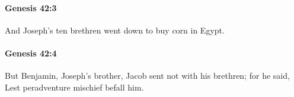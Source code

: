 		\paragraph{Genesis 42:3} %
			\label{GENESIS-42-3}

			And Joseph's ten brethren went down to buy corn in Egypt.


		\paragraph{Genesis 42:4} %
			\label{GENESIS-42-4}

			But Benjamin, Joseph's brother, Jacob sent not with his brethren; for he said, Lest peradventure mischief befall him.


